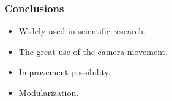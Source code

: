 \begin{frame}
    \frametitle{Conclusions}
    \begin{itemize}
        \item Widely used in scientific research.
        \item The great use of the camera movement.
        \item Improvement possibility.
        \item Modularization.
    \end{itemize}
\end{frame}
